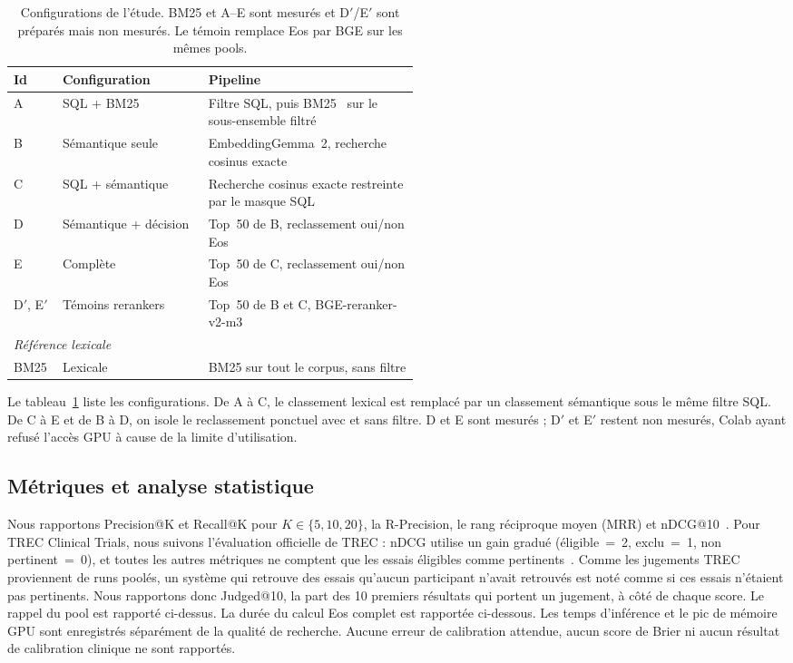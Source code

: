 \documentclass{article}
\begin{document}
\begin{table}[t]
  \caption{Configurations de l'étude. BM25 et A--E sont mesurés et D$'$/E$'$ sont préparés mais non mesurés. Le témoin remplace Eos par BGE sur les mêmes pools.}
  \label{tab:configs}
  \centering
  \small
  \begin{tabular}{llp{0.52\linewidth}}
    \toprule
    Id & Configuration & Pipeline \\
    \midrule
    A & SQL + BM25 & Filtre SQL, puis BM25~\citep{robertson2009bm25} sur le sous-ensemble filtré \\
    B & Sémantique seule & EmbeddingGemma~2, recherche cosinus exacte \\
    C & SQL + sémantique & Recherche cosinus exacte restreinte par le masque SQL \\
    D & Sémantique + décision & Top~50 de B, reclassement oui/non Eos \\
    E & Complète & Top~50 de C, reclassement oui/non Eos \\
    D$'$, E$'$ & Témoins rerankers & Top~50 de B et C, BGE-reranker-v2-m3~\citep{chen2024bgem3} \\
    \midrule
    \multicolumn{3}{l}{\emph{Référence lexicale}} \\
    BM25 & Lexicale & BM25 sur tout le corpus, sans filtre \\
    \bottomrule
  \end{tabular}
\end{table}

Le tableau~\ref{tab:configs} liste les configurations. De A à C, le classement lexical est remplacé par un classement sémantique sous le même filtre SQL. De C à E et de B à D, on isole le reclassement ponctuel avec et sans filtre. D et E sont mesurés ; D$'$ et E$'$ restent non mesurés, Colab ayant refusé l'accès GPU à cause de la limite d'utilisation.

\subsection{Métriques et analyse statistique}

Nous rapportons Precision@K et Recall@K pour $K \in \{5, 10, 20\}$, la R-Precision, le rang réciproque moyen (MRR) et nDCG@10~\citep{jarvelin2002ndcg}. Pour TREC Clinical Trials, nous suivons l'évaluation officielle de TREC : nDCG utilise un gain gradué (éligible~=~2, exclu~=~1, non pertinent~=~0), et toutes les autres métriques ne comptent que les essais éligibles comme pertinents~\citep{roberts2022trecct}. Comme les jugements TREC proviennent de runs poolés, un système qui retrouve des essais qu'aucun participant n'avait retrouvés est noté comme si ces essais n'étaient pas pertinents. Nous rapportons donc Judged@10, la part des 10 premiers résultats qui portent un jugement, à côté de chaque score. Le rappel du pool est rapporté ci-dessus. La durée du calcul Eos complet est rapportée ci-dessous. Les temps d'inférence et le pic de mémoire GPU sont enregistrés séparément de la qualité de recherche. Aucune erreur de calibration attendue, aucun score de Brier ni aucun résultat de calibration clinique ne sont rapportés.
\end{document}
